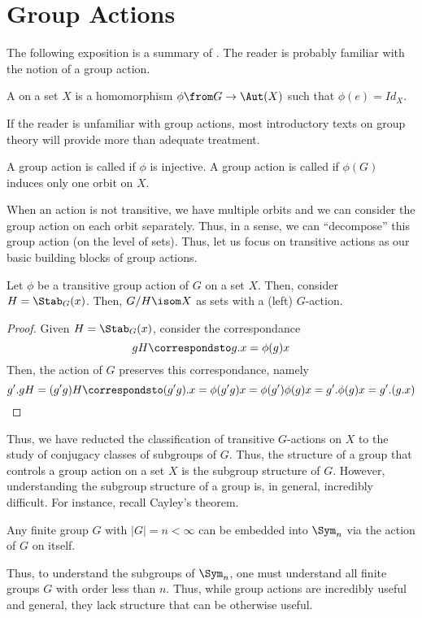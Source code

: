 \documentclass[11pt,leqno,oneside]{amsbook}
\numberwithin{thm}{section}
\begin{document}
\section{Group Actions}
The following exposition is a summary of \cite{princeton-companion}. The reader is probably familiar with the notion of a group action.
\begin{defn}
  A  on a set \(X\) is a homomorphism \(\phi \from G \to \Aut(X)\)
  such that \(\phi(e) = Id_X\).
\end{defn}
If the reader is unfamiliar with group actions, most introductory
texts on group theory will provide more than adequate treatment.
\begin{defn}
  A group action is called  if \(\phi\) is injective. A
  group action is called  if \(\phi(G)\) induces only
  one orbit on \(X\).
\end{defn}
When an action is not transitive, we have multiple orbits and we can
consider the group action on each orbit separately. Thus, in a sense,
we can ``decompose'' this group action (on the level of sets). Thus,
let us focus on transitive actions as our basic building blocks of
group actions.
\begin{thm}
  Let \(\phi\) be a transitive group action of \(G\) on a set \(X\). Then,
  consider \(H = \Stab_G(x)\). Then, \(G/H \isom X\) as sets with a
  (left) \(G\)-action.
\end{thm}
\begin{proof}
  Given \(H = \Stab_G(x)\), consider the correspondance \[
    gH \correspondsto g.x = \phi(g)x
  \]
  Then, the action of \(G\) preserves this correspondance, namely \[
    g'.gH = (g'g)H \correspondsto (g'g).x = \phi(g'g)x = \phi(g')\phi(g)x
    = g'.\phi(g)x = g'.(g.x)
  \]
\end{proof}
Thus, we have reducted the classification of transitive \(G\)-actions
on \(X\) to the study of conjugacy classes of subgroups of
\(G\). Thus, the structure of a group that controls a group action on
a set \(X\) is the subgroup structure of \(G\). However, understanding
the subgroup structure of a group is, in general, incredibly
difficult. For instance, recall Cayley's theorem.
\begin{thm}
  Any finite group \(G\) with \(|G| = n < \infty\) can be embedded
  into \(\Sym_n\) via the action of \(G\) on itself. 
\end{thm}
Thus, to understand the subgroups of \(\Sym_n\), one must understand all
finite groups \(G\) with order less than \(n\). Thus, while group
actions are incredibly useful and general, they lack structure that
can be otherwise useful.
\end{document}
